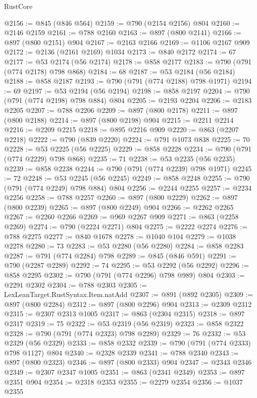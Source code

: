 \begin{lexlean}{RustCore}
\begin{coremodule}
@2156 := @845 (@846 @564)
@2159 := @790 (@2154 @2156) @804
@2160 := @2146 @2159
@2161 := @788 @2160
@2163 := @897 (@800 @2141)
@2166 := @897 (@800 @2151) @904
@2167 := @2163 @2166
@2169 := @1106 @2167 @909
@2172 := @2136 (@2161 @2169) @1034
@2173 := @840 @2172
@2174 := 67
@2177 := @53 @2174 (@56 @2174)
@2178 := @858 @2177
@2183 := @790 (@791 (@774 @2178) @798 @868)
@2184 := 68
@2187 := @53 @2184 (@56 @2184)
@2188 := @858 @2187
@2193 := @790 (@791 (@774 @2188) @798 @1971)
@2194 := 69
@2197 := @53 @2194 (@56 @2194)
@2198 := @858 @2197
@2204 := @790 (@791 (@774 @2198) @798 @884) @804
@2205 := @2193 @2204
@2206 := @2183 @2205
@2207 := @788 @2206
@2209 := @897 (@800 @2178)
@2211 := @897 (@800 @2188)
@2214 := @897 (@800 @2198) @904
@2215 := @2211 @2214
@2216 := @2209 @2215
@2218 := @895 @2216 @909
@2220 := @863 (@2207 @2218)
@2222 := @790 (@839 @2220)
@2224 := @791 @1073 @838
@2225 := 70
@2228 := @53 @2225 (@56 @2225)
@2229 := @858 @2228
@2234 := @790 (@791 (@774 @2229) @798 @868)
@2235 := 71
@2238 := @53 @2235 (@56 @2235)
@2239 := @858 @2238
@2244 := @790 (@791 (@774 @2239) @798 @1971)
@2245 := 72
@2248 := @53 @2245 (@56 @2245)
@2249 := @858 @2248
@2255 := @790 (@791 (@774 @2249) @798 @884) @804
@2256 := @2244 @2255
@2257 := @2234 @2256
@2258 := @788 @2257
@2260 := @897 (@800 @2229)
@2262 := @897 (@800 @2239)
@2265 := @897 (@800 @2249) @904
@2266 := @2262 @2265
@2267 := @2260 @2266
@2269 := @969 @2267 @909
@2271 := @863 (@2258 @2269)
@2274 := @790 (@2224 @2271) @804
@2275 := @2222 @2274
@2276 := @788 @2275
@2277 := @840 @1678
@2278 := @1040 @104
@2279 := @1038 @2278
@2280 := 73
@2283 := @53 @2280 (@56 @2280)
@2284 := @858 @2283
@2287 := @791 (@774 @2284) @798
@2289 := @845 (@846 @591)
@2291 := @790 (@2287 @2289)
@2292 := 74
@2295 := @53 @2292 (@56 @2292)
@2296 := @858 @2295
@2302 := @790 (@791 (@774 @2296) @798 @989) @804
@2303 := @2291 @2302
@2304 := @788 @2303
@2305 := LexLeanTarget.RustSyntax.Item.natAdd
@2307 := @891 (@892 @2305)
@2309 := @897 (@800 @2284)
@2312 := @897 (@800 @2296) @904
@2313 := @2309 @2312
@2315 := @2307 @2313 @1005
@2317 := @863 (@2304 @2315)
@2318 := @897 @2317
@2319 := 75
@2322 := @53 @2319 (@56 @2319)
@2323 := @858 @2322
@2328 := @790 (@791 (@774 @2323) @798 @2289)
@2329 := 76
@2332 := @53 @2329 (@56 @2329)
@2333 := @858 @2332
@2339 := @790 (@791 (@774 @2333) @798 @1127) @804
@2340 := @2328 @2339
@2341 := @788 @2340
@2343 := @897 (@800 @2323)
@2346 := @897 (@800 @2333) @904
@2347 := @2343 @2346
@2349 := @2307 @2347 @1005
@2351 := @863 (@2341 @2349)
@2353 := @897 @2351 @904
@2354 := @2318 @2353
@2355 := @2279 @2354
@2356 := @1037 @2355

\end{coremodule}
\end{lexlean}

